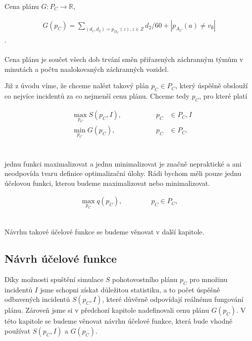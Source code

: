 \begin{definice}
  Cena plánu $G \colon P_C \rightarrow \mathbb{R}$,

  \begin{align}
    G(p_C) = \sum_{(d_1, d_2) = p_{D_C}(z), z \in Z} d_2 / 60 + |p_{A_C}(a) \neq v_{\emptyset}|
  \end{align}
  .
  \\
  \\
  Cena plánu je součet všech dob trvání směn přiřazených záchranným týmům v minutách a počtu naalokovaných záchranných vozidel.
\end{definice}

Již z úvodu víme, že chceme nalézt takový plán $p_C \in P_C$, který úspěšně obslouží co nejvíce incidentů za co nejmenší cenu plánu.
Chceme tedy $p_C$, pro které platí

\begin{align}
  &\max_{p_C} S(p_C, I), \hspace{50pt} &p_C &\in P_C, I \\ 
  &\min_{p_C} G(p_C), \hspace{50pt}    &p_C &\in P_C.
\end{align}
\\
\\
jednu funkci maximalizovat a jednu minimalizovat je značně nepraktické a ani neodpovída tvaru definice optimalizační úlohy.
Rádi bychom měli pouze jednu účelovou funkci, kterou budeme maximalizovat nebo minimalizovat.

\begin{definice}
  \begin{align}
    \max_{p_C} q(p_C), \hspace{50pt} p_C \in P_C,
  \end{align}
  \\
\end{definice}

Návrhu takové účelové funkce se budeme věnovat v další kapitole. %

\subsection{Návrh účelové funkce}

Díky možnosti spuštění simulace $S$ pohotovostního plánu $p_C$ pro množinu incidentů $I$ jsme schopni získat důležitou statistiku, a to počet úspěšně odbavených incidentů $S(p_C, I)$,
které důvěrně odpovídají reálnému fungování plánu. Zároveň jsme si v předchozí kapitole %
nadefinovali cenu plánu $G(p_C)$. V této kapitole se budeme věnovat návrhu účelové funkce, která bude vhodně používat $S(p_C, I)$ a $G(p_C)$.

